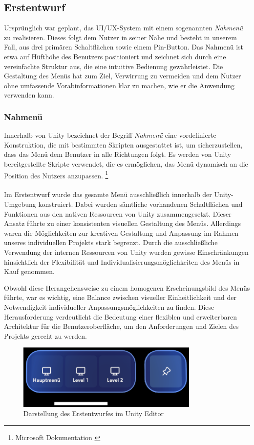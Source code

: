 \subsection{Erstentwurf}
Ursprünglich war geplant, das UI/UX-System mit einem sogenannten \textit{Nahmenü} zu realisieren. Dieses folgt dem Nutzer in seiner Nähe und besteht in unserem Fall, aus drei primären Schaltflächen sowie einem Pin-Button. Das Nahmenü ist etwa auf Hüfthöhe des Benutzers positioniert und zeichnet sich durch eine vereinfachte Struktur aus, die eine intuitive Bedienung gewährleistet. Die Gestaltung des Menüs hat zum Ziel, Verwirrung zu vermeiden und dem Nutzer ohne umfassende Vorabinformationen klar zu machen, wie er die Anwendung verwenden kann.

\subsubsection*{Nahmenü}
Innerhalb von Unity bezeichnet der Begriff \textit{Nahmenü} eine vordefinierte Konstruktion, die mit bestimmten Skripten ausgestattet ist, um sicherzustellen, dass das Menü dem Benutzer in alle Richtungen folgt. Es werden von Unity bereitgestellte Skripte verwendet, die es ermöglichen, das Menü dynamisch an die Position des Nutzers anzupassen. \footnote{Microsoft Dokumentation \cite{Naehemenue MRTK2}} \\
\\
Im Erstentwurf wurde das gesamte Menü ausschließlich innerhalb der Unity-Umgebung konstruiert. Dabei wurden sämtliche vorhandenen Schaltflächen und Funktionen aus den nativen Ressourcen von Unity zusammengesetzt. Dieser Ansatz führte zu einer konsistenten visuellen Gestaltung des Menüs. Allerdings waren die Möglichkeiten zur kreativen Gestaltung und Anpassung im Rahmen unseres individuellen Projekts stark begrenzt. Durch die ausschließliche Verwendung der internen Ressourcen von Unity wurden gewisse Einschränkungen hinsichtlich der Flexibilität und Individualisierungsmöglichkeiten des Menüs in Kauf genommen.

Obwohl diese Herangehensweise zu einem homogenen Erscheinungsbild des Menüs führte, war es wichtig, eine Balance zwischen visueller Einheitlichkeit und der Notwendigkeit individueller Anpassungsmöglichkeiten zu finden. Diese Herausforderung verdeutlicht die Bedeutung einer flexiblen und erweiterbaren Architektur für die Benutzeroberfläche, um den Anforderungen und Zielen des Projekts gerecht zu werden.
\begin{figure}[H]
    \centering
    \includegraphics[width=0.8\textwidth]{images/menubarversion1.png}
    \caption{Darstellung des Erstentwurfes im Unity Editor}
    \label{fig:menübar}
\end{figure}

